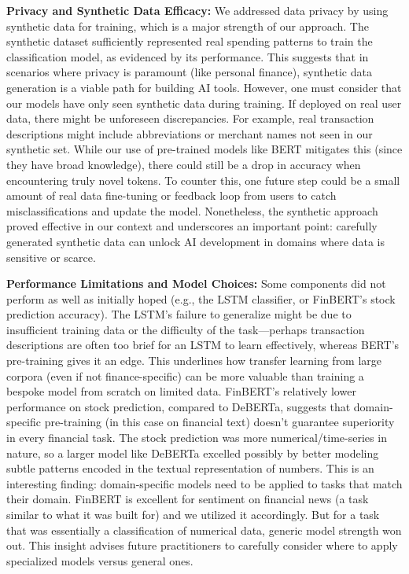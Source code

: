 \documentclass{scrartcl}
\begin{document}
\textbf{Privacy and Synthetic Data Efficacy:} We addressed data privacy by using synthetic data for training, which is a major strength of our approach. The synthetic dataset sufficiently represented real spending patterns to train the classification model, as evidenced by its performance. This suggests that in scenarios where privacy is paramount (like personal finance), synthetic data generation is a viable path for building AI tools. However, one must consider that our models have only seen synthetic data during training. If deployed on real user data, there might be unforeseen discrepancies. For example, real transaction descriptions might include abbreviations or merchant names not seen in our synthetic set. While our use of pre-trained models like BERT mitigates this (since they have broad knowledge), there could still be a drop in accuracy when encountering truly novel tokens. To counter this, one future step could be a small amount of real data fine-tuning or feedback loop from users to catch misclassifications and update the model. Nonetheless, the synthetic approach proved effective in our context and underscores an important point: carefully generated synthetic data can unlock AI development in domains where data is sensitive or scarce.

\textbf{Performance Limitations and Model Choices:} Some components did not perform as well as initially hoped (e.g., the LSTM classifier, or FinBERT’s stock prediction accuracy). The LSTM’s failure to generalize might be due to insufficient training data or the difficulty of the task—perhaps transaction descriptions are often too brief for an LSTM to learn effectively, whereas BERT’s pre-training gives it an edge. This underlines how transfer learning from large corpora (even if not finance-specific) can be more valuable than training a bespoke model from scratch on limited data. FinBERT’s relatively lower performance on stock prediction, compared to DeBERTa, suggests that domain-specific pre-training (in this case on financial text) doesn’t guarantee superiority in every financial task. The stock prediction was more numerical/time-series in nature, so a larger model like DeBERTa excelled possibly by better modeling subtle patterns encoded in the textual representation of numbers. This is an interesting finding: domain-specific models need to be applied to tasks that match their domain. FinBERT is excellent for sentiment on financial news (a task similar to what it was built for) and we utilized it accordingly. But for a task that was essentially a classification of numerical data, generic model strength won out. This insight advises future practitioners to carefully consider where to apply specialized models versus general ones.
\end{document}
